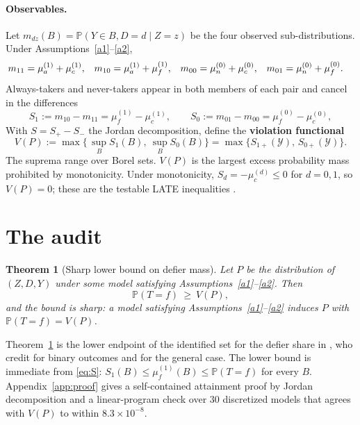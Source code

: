 \documentclass{article}
\newtheorem{theorem}{Theorem}
\theoremstyle{remark}
\newcommand{\Prob}{\mathbb{P}}
\newcommand{\Yspace}{\mathcal{Y}}
\begin{document}
\paragraph{Observables.} Let $m_{dz}(B)=\Prob(Y\in B,D{=}d\mid Z{=}z)$ be the four observed sub-distributions. Under Assumptions~\ref{a1}--\ref{a2},
\begin{align}
m_{11}&=\mu_a^{(1)}+\mu_c^{(1)}, & m_{10}&=\mu_a^{(1)}+\mu_f^{(1)}, &
m_{00}&=\mu_n^{(0)}+\mu_c^{(0)}, & m_{01}&=\mu_n^{(0)}+\mu_f^{(0)}.\notag
\end{align}
Always-takers and never-takers appear in both members of each pair and cancel in the differences
\begin{equation}\label{eq:S}
S_1:=m_{10}-m_{11}=\mu_f^{(1)}-\mu_c^{(1)},\qquad
S_0:=m_{01}-m_{00}=\mu_f^{(0)}-\mu_c^{(0)},
\end{equation}
With $S=S_+-S_-$ the Jordan decomposition, define the \textbf{violation functional}
\begin{equation}\label{eq:V}
V(P):=\max\Big\{\,\sup_{B}S_1(B),\ \sup_{B}S_0(B)\Big\}=\max\big\{S_{1+}(\Yspace),\,S_{0+}(\Yspace)\big\}.
\end{equation}
The suprema range over Borel sets. $V(P)$ is the largest excess probability
mass prohibited by monotonicity. Under monotonicity,
$S_d=-\mu_c^{(d)}\le0$ for $d=0,1$, so $V(P)=0$; these are the
testable LATE inequalities \citep{kitagawa2015,mourifie2017}.

\section{The audit}\label{sec:audit}

\begin{theorem}[Sharp lower bound on defier mass]\label{thm:audit}
Let $P$ be the distribution of $(Z,D,Y)$ under some model satisfying Assumptions~\ref{a1}--\ref{a2}. Then
\[
\Prob(T=f)\ \ge\ V(P),
\]
and the bound is sharp: a model satisfying Assumptions~\ref{a1}--\ref{a2} induces $P$ with $\Prob(T=f)=V(P)$.
\end{theorem}

Theorem~\ref{thm:audit} is the lower endpoint of the identified set for the
defier share in \citet[Prop.~1]{kedagni2024robust}, who credit
\citet{richardson2010binary} for binary outcomes and
\citet[Prop.~1, eq.~(15)]{noack2021sensitivity} for the general case. The lower bound is immediate
from \eqref{eq:S}: $S_1(B)\le\mu_f^{(1)}(B)\le\Prob(T=f)$ for every $B$.
Appendix~\ref{app:proof} gives a self-contained attainment proof by Jordan
decomposition and a linear-program check over $30$ discretized models that
agrees with $V(P)$ to within $8.3\times10^{-8}$.
\end{document}
